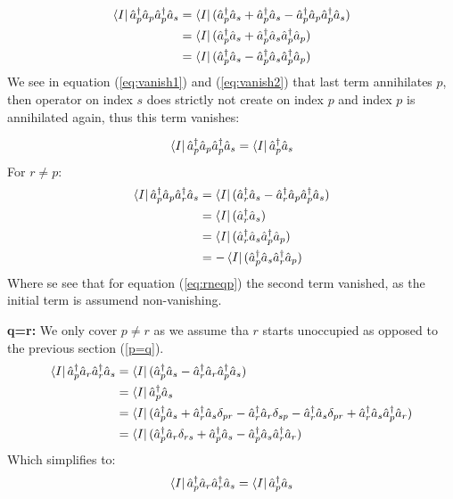 \begin{align}
    \bra{I} \hat{a}^\dagger_p \hat{a}_p \hat{a}^\dagger_p \hat{a}_s & =   \bra{I} (\hat{a}^\dagger_p \hat{a}_s + \hat{a}^\dagger_p \hat{a}_s - \hat{a}^\dagger_p \hat{a}_p \hat{a}^\dagger_p \hat{a}_s ) \\
  & =   \bra{I} (\hat{a}^\dagger_p \hat{a}_s + \hat{a}^\dagger_p \hat{a}_s \hat{a}^\dagger_p \hat{a}_p) \label{eq:vanish1} \\
  & =   \bra{I} (\hat{a}^\dagger_p \hat{a}_s - \hat{a}^\dagger_p \hat{a}_s \hat{a}^\dagger_p \hat{a}_p) \label{eq:vanish2}
\end{align}
We see in equation (\ref{eq:vanish1}) and (\ref{eq:vanish2}) that last term annihilates $p$, then operator on index $s$ does strictly not create on index $p$ and index $p$ is annihilated again, thus this term vanishes:

\begin{equation}
 \bra{I}  \hat{a}^\dagger_p \hat{a}_p \hat{a}^\dagger_p \hat{a}_s = \bra{I} \hat{a}^\dagger_p \hat{a}_s
\end{equation}
For $r \neq p$:
\begin{align}
    \bra{I} \hat{a}^\dagger_p \hat{a}_p \hat{a}^\dagger_r \hat{a}_s & =   \bra{I} ( \hat{a}^\dagger_r  \hat{a}_s - \hat{a}^\dagger_r \hat{a}_p \hat{a}^\dagger_p \hat{a}_s ) \nonumber \\
  & =   \bra{I} (\hat{a}^\dagger_r  \hat{a}_s) \label{eq:rneqp}\\
  & =   \bra{I} ( \hat{a}^\dagger_r \hat{a}_s \hat{a}^\dagger_p \hat{a}_p) \\
  & = -   \bra{I} (\hat{a}^\dagger_p \hat{a}_s \hat{a}^\dagger_r \hat{a}_p)
\end{align}
Where se see that for equation (\ref{eq:rneqp}) the second term vanished, as the initial term is assumend non-vanishing.

\textbf{q=r:}
We only cover $p \neq r$ as we assume tha $r$ starts unoccupied as opposed to the previous section (\ref{p=q}).
\begin{align}
  \bra{I} \hat{a}^\dagger_p \hat{a}_r \hat{a}^\dagger_r \hat{a}_s & =   \bra{I} (\hat{a}^\dagger_p \hat{a}_s - \hat{a}^\dagger_r \hat{a}_r \hat{a}^\dagger_p \hat{a}_s) \nonumber \\
  & =   \bra{I} \hat{a}^\dagger_p \hat{a}_s  \\
  & =   \bra{I} (\hat{a}^\dagger_p \hat{a}_s + \hat{a}^\dagger_r \hat{a}_s \delta_{pr} - \hat{a}^\dagger_r \hat{a}_r  \delta_{sp} - \hat{a}^\dagger_r \hat{a}_s \delta_{pr} + \hat{a}^\dagger_r \hat{a}_s \hat{a}^\dagger_p \hat{a}_r) \\
  & =   \bra{I} (\hat{a}^\dagger_p \hat{a}_r \delta_{rs} + \hat{a}^\dagger_p \hat{a}_s - \hat{a}^\dagger_p \hat{a}_s \hat{a}^\dagger_r \hat{a}_r)
\end{align}
Which simplifies to:
\begin{equation}
    \bra{I} \hat{a}^\dagger_p \hat{a}_r \hat{a}^\dagger_r \hat{a}_s =   \bra{I} \hat{a}^\dagger_p \hat{a}_s
\end{equation}


